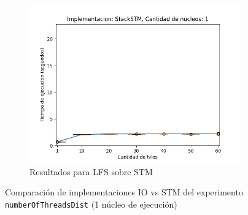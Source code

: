 \begin{appendices}
\begin{figure}[H]
\begin{subfigure}[b]{0.49\textwidth}
        \includegraphics[width=\textwidth]{images/numberOfThreadsDist/plots/expStackSTM-1}
        \caption{Resultados para LFS sobre STM}
        \label{subfig:numberOfThreadsDist-stackstm-1}
    \end{subfigure}
    \caption{Comparación de implementaciones IO vs STM del experimento \texttt{numberOfThreadsDist} (1 núcleo de ejecución)}
    \label{fig:numberOfThreadsDist-boxplots-1}
\end{figure}


\end{appendices}
